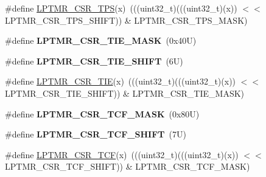 \begin{DoxyCompactItemize}
\item 
\#define \mbox{\hyperlink{group___l_p_t_m_r___register___masks_ga21ce2f3d05c087f7f46dcb9b7035e4f2}{L\+P\+T\+M\+R\+\_\+\+C\+S\+R\+\_\+\+T\+PS}}(x)~(((uint32\+\_\+t)(((uint32\+\_\+t)(x)) $<$$<$ L\+P\+T\+M\+R\+\_\+\+C\+S\+R\+\_\+\+T\+P\+S\+\_\+\+S\+H\+I\+FT)) \& L\+P\+T\+M\+R\+\_\+\+C\+S\+R\+\_\+\+T\+P\+S\+\_\+\+M\+A\+SK)
\item 
\mbox{\label{group___l_p_t_m_r___register___masks_gabb726cb43d5f6ee38339048c69a5f086}} 
\#define {\bfseries L\+P\+T\+M\+R\+\_\+\+C\+S\+R\+\_\+\+T\+I\+E\+\_\+\+M\+A\+SK}~(0x40\+U)
\item 
\mbox{\label{group___l_p_t_m_r___register___masks_gaaedba0195b3abfcae6e8669f84f39d5d}} 
\#define {\bfseries L\+P\+T\+M\+R\+\_\+\+C\+S\+R\+\_\+\+T\+I\+E\+\_\+\+S\+H\+I\+FT}~(6\+U)
\item 
\#define \mbox{\hyperlink{group___l_p_t_m_r___register___masks_ga1b3ffe4be02efef291da12ce9e097a9d}{L\+P\+T\+M\+R\+\_\+\+C\+S\+R\+\_\+\+T\+IE}}(x)~(((uint32\+\_\+t)(((uint32\+\_\+t)(x)) $<$$<$ L\+P\+T\+M\+R\+\_\+\+C\+S\+R\+\_\+\+T\+I\+E\+\_\+\+S\+H\+I\+FT)) \& L\+P\+T\+M\+R\+\_\+\+C\+S\+R\+\_\+\+T\+I\+E\+\_\+\+M\+A\+SK)
\item 
\mbox{\label{group___l_p_t_m_r___register___masks_ga13b5dd6085ca2a8cf0f06550b7557b6b}} 
\#define {\bfseries L\+P\+T\+M\+R\+\_\+\+C\+S\+R\+\_\+\+T\+C\+F\+\_\+\+M\+A\+SK}~(0x80\+U)
\item 
\mbox{\label{group___l_p_t_m_r___register___masks_ga0ffa48fac670327deffc2e17ef1dea68}} 
\#define {\bfseries L\+P\+T\+M\+R\+\_\+\+C\+S\+R\+\_\+\+T\+C\+F\+\_\+\+S\+H\+I\+FT}~(7\+U)
\item 
\#define \mbox{\hyperlink{group___l_p_t_m_r___register___masks_ga4a71110198e9becb2fe277e270c7499d}{L\+P\+T\+M\+R\+\_\+\+C\+S\+R\+\_\+\+T\+CF}}(x)~(((uint32\+\_\+t)(((uint32\+\_\+t)(x)) $<$$<$ L\+P\+T\+M\+R\+\_\+\+C\+S\+R\+\_\+\+T\+C\+F\+\_\+\+S\+H\+I\+FT)) \& L\+P\+T\+M\+R\+\_\+\+C\+S\+R\+\_\+\+T\+C\+F\+\_\+\+M\+A\+SK)
\end{DoxyCompactItemize}
